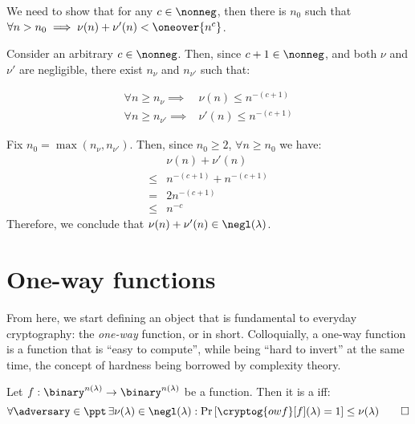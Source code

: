\begin{solution}[\ref{ex:negl}]

    
    We need to show that for any $c \in \nonneg $, then there is $n_0$ such that $\forall n > n_{0} \implies \nu(n) + \nu'(n) < \oneover{n^c}$.
    
    Consider an arbitrary $c \in \nonneg$. Then, since $c + 1 \in \nonneg$, and both $\nu$ and $\nu'$ are negligible, there exist $n_\nu$ and $n_{\nu'}$ such that:
    
    \begin{align*}
        \forall n \geq n_{\nu} \implies& \nu(n) \leq n^{-(c+1)} \\
        \forall n \geq n_{\nu'} \implies& \nu'(n) \leq n^{-(c+1)}
    \end{align*}

    Fix $n_{0} = \max(n_{\nu}, n_{\nu'})$. Then, since $n_0 \geq 2$, $\forall n \geq n_0$ we have:
    \begin{align*}
        & \nu(n) + \nu'(n) \\
        \leq& n^{-(c+1)} + n^{-(c+1)} \\
        =& 2n^{-(c+1)} \\
        \leq& n^{-c}
    \end{align*}
    Therefore, we conclude that $\nu(n) + \nu'(n) \in \negl(\lambda)$.
\end{solution}


\section{One-way functions}

From here, we start defining an object that is fundamental to everyday cryptography: the \emph{one-way} function, or \owf{} in short. Colloquially, a one-way function is a function that is ``easy to compute'', while being ``hard to invert'' at the same time, the concept of hardness being borrowed by complexity theory.

\begin{definition}    
    Let $f : \binary^{n(\lambda)} \to \binary^{n(\lambda)}$ be a function. Then it is a \owf{} iff:
    \[
        \forall \adversary \in \ppt\, \exists \nu(\lambda) \in \negl(\lambda) : \Pr\left[\cryptog{owf}[f](\lambda) = 1 \right] \leq \nu(\lambda) \qedhere
    \]
\end{definition}


